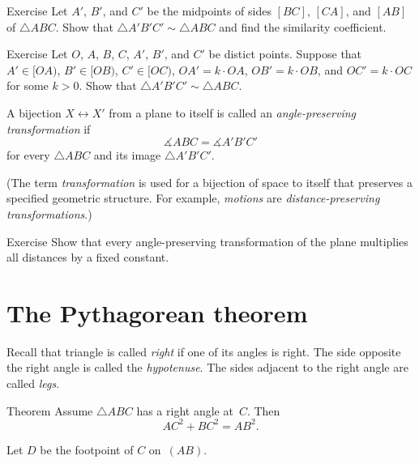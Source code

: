 \begin{thm}{Exercise}\label{ex:mid-triangle}
Let $A'$, $B'$, and $C'$ be the midpoints of sides $[BC]$, $[CA]$, and $[AB]$ of $\triangle ABC$.
Show that $\triangle A'B'C'\sim\triangle ABC$ and find the similarity coefficient.
\end{thm}

\begin{thm}{Exercise}\label{ex:k*triangle}
Let $O$, $A$, $B$, $C$, $A'$, $B'$, and $C'$ be distict points.
Suppose that $A'\in [OA)$, $B'\in[OB)$, $C'\in [OC)$, $OA'=k\cdot OA$, $OB'=k\cdot OB$, and $OC'=k\cdot OC$ for some $k>0$.
Show that $\triangle A'B'C'\sim\triangle ABC$.
\end{thm}

A bijection $X\leftrightarrow X'$ from a plane to itself is called an \emph{angle-preserving transformation} if 
\[\measuredangle ABC= \measuredangle A'B'C'\]
for every $\triangle ABC$ and its image $\triangle A'B'C'$.

(The term \emph{transformation} is used for a bijection of space to itself that preserves a specified geometric structure.
For example, {}\emph{motions} are \textit{distance-preserving transformations}.)


\begin{thm}{Exercise}\label{ex:angle-preserving-euclid}
Show that every angle-preserving transformation of the plane multiplies all distances by a fixed constant.
\end{thm}

\section{The Pythagorean theorem}

Recall that triangle is called \emph{right} if one of its angles is right.
The side opposite the right angle is called the \emph{hypotenuse}. 
The sides adjacent to the right angle are called \emph{legs}. 


\begin{thm}{Theorem}\label{thm:pyth}
Assume $\triangle ABC$ has a right angle at~$C$.
Then
$$AC^2+BC^2=AB^2.$$ 

\end{thm}

Let $D$ be the footpoint of $C$ on~$(AB)$.

